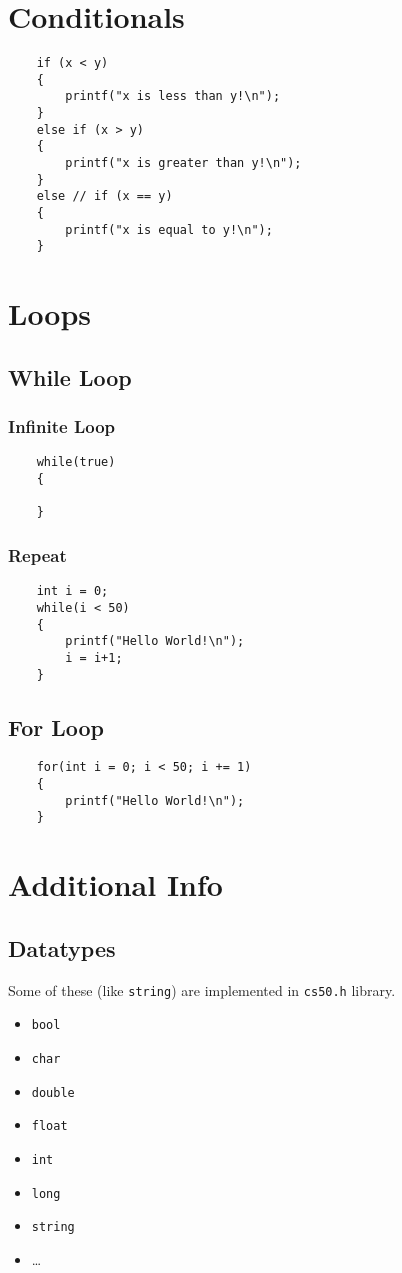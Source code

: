 \section{Conditionals}
\begin{verbatim}
	if (x < y)
	{
		printf("x is less than y!\n");
	}
	else if (x > y)
	{
		printf("x is greater than y!\n");
	}
	else // if (x == y)
	{
		printf("x is equal to y!\n");
	}
\end{verbatim}

\section{Loops}
\subsection{While Loop}
\subsubsection{Infinite Loop}
\begin{verbatim}
	while(true)
	{

	}
\end{verbatim}

\subsubsection{Repeat}
\begin{verbatim}
	int i = 0;
	while(i < 50)
	{
		printf("Hello World!\n");
		i = i+1;
	}
\end{verbatim}

\subsection{For Loop}
\begin{verbatim}
	for(int i = 0; i < 50; i += 1)
	{
		printf("Hello World!\n");
	}
\end{verbatim}

\section{Additional Info}
\subsection{Datatypes}
Some of these (like \texttt{string}) are implemented in \texttt{cs50.h} library.
\begin{itemize}
	\item \texttt{bool}
	\item \texttt{char}
	\item \texttt{double}
	\item \texttt{float}
	\item \texttt{int}
	\item \texttt{long}
	\item \texttt{string}
	\item \dots
\end{itemize}

